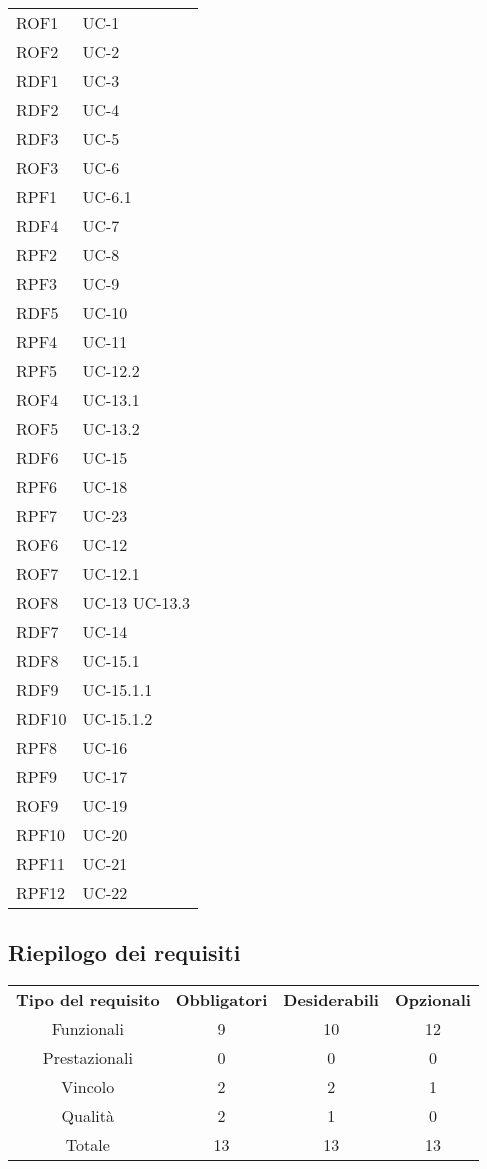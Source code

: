 \begin{longtable}{| p{5cm} | p{5cm} |}
		ROF1 & UC-1 \\
		ROF2 & UC-2 \\
		RDF1 & UC-3 \\
		RDF2 & UC-4 \\
		RDF3 & UC-5 \\
		ROF3 & UC-6 \\
		RPF1 & UC-6.1 \\
		RDF4 & UC-7 \\
		RPF2 & UC-8 \\
		RPF3 & UC-9 \\
		RDF5 & UC-10 \\
		RPF4 & UC-11 \\
		RPF5 &UC-12.2 \\
		ROF4 & UC-13.1 \\
		ROF5 & UC-13.2 \\
		RDF6 & UC-15 \\
		RPF6 & UC-18 \\
		RPF7 & UC-23 \\
		ROF6 & UC-12 \\
		ROF7 & UC-12.1 \\
		ROF8 & UC-13 \newline UC-13.3 \\
		RDF7 & UC-14\\
		RDF8 & UC-15.1\\
		RDF9 & UC-15.1.1\\
		RDF10 & UC-15.1.2\\
		RPF8 & UC-16\\
		RPF9 & UC-17\\
		ROF9 & UC-19 \\
		RPF10 & UC-20\\
		RPF11 & UC-21 \\
		RPF12 & UC-22 \\ \hline
		
\end{longtable}

\subsection{Riepilogo dei requisiti}
\begin{tabular}{| c | c | c | c |}
		\rowcolor{LightBlue}
		\color{white}\bfseries Tipo del requisito & \color{white}\bfseries Obbligatori & \color{white}\bfseries Desiderabili & \color{white}\bfseries Opzionali \\[0.25cm]
		 Funzionali & 9 & 10 & 12 \\
		 Prestazionali & 0 & 0 & 0 \\
		 Vincolo & 2 & 2 & 1 \\
		 Qualità & 2 & 1 & 0 \\
		 Totale & 13 & 13 & 13 \\ \hline
\end{tabular}